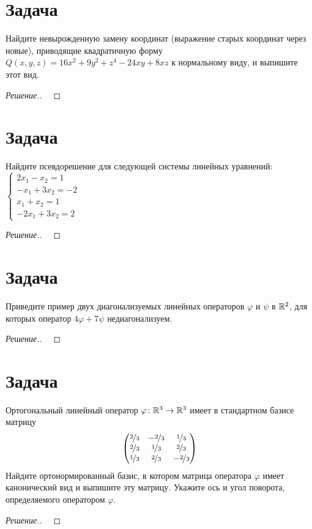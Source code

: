 \documentclass[a4paper]{article}
\theoremstyle{remark}
\newcommand{\eq}[1]{\begin{cases} #1 \end{cases}}
\begin{document}
    \section*{Задача }
        Найдите невырожденную замену координат (выражение старых координат через 
        новые), приводящие квадратичную форму $Q(x, y, z) = 16x^2 + 9y^2 + z^4 - 24xy + 8xz$
        к нормальному виду, и выпишите этот вид.
        \begin{proof}[Решение.] \ 
            

        \end{proof}

    \section*{Задача }
        Найдите псевдорешение для следующей системы линейных уравнений: 
        $\eq{
            2x_1 - x_2 = 1\\
            -x_1 + 3x_2 = -2 \\
            x_1 + x_2 = 1 \\
            -2x_1 + 3x_2 = 2
        }$
        \begin{proof}[Решение.] \ 
            

        \end{proof}
    
    \section*{Задача }
        Приведите пример двух диагонализуемых линейных операторов $\varphi$ и 
        $\psi$ в $\mathbb{R}^2$, для которых оператор $4\varphi + 7\psi$ недиагонализуем.
        \begin{proof}[Решение.] \ 
            

        \end{proof}
    
    \section*{Задача }
        Ортогональный линейный оператор $\varphi \colon \mathbb{R}^3 \to \mathbb{R}^3$ имеет в стандартном
        базисе матрицу 
        $$
        \begin{pmatrix}
            \nicefrac23 & -\nicefrac23 & \nicefrac13 \\
            \nicefrac23 & \nicefrac13 & \nicefrac23 \\
            \nicefrac13 & \nicefrac23 & -\nicefrac23 \\
        \end{pmatrix}
        $$
        Найдите ортонормированный базис, в котором матрица оператора $\varphi$ имеет 
        канонический вид и выпишите эту матрицу. Укажите ось и угол поворота, определяемого 
        оператором $\varphi$.
        \begin{proof}[Решение.] \ 
            

        \end{proof}
\end{document}
